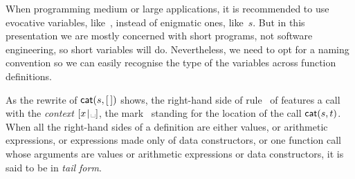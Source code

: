 When programming medium or large applications, it is recommended to
use evocative variables, like~, instead of
enigmatic ones, like~\(s\). But in this presentation we are mostly
concerned with short programs, not software engineering, so short
variables will do. Nevertheless, we need to opt for a naming
convention so we can easily recognise the type of the variables across
function definitions.


As the rewrite of \(\textsf{cat}(s,[\,])\) shows, the right\hyp{}hand side
of rule~\clause{\beta} of  features a call with the
\emph{context} \(\cons{x}{\text{\textvisiblespace}}\), the
mark~\textvisiblespace{} standing for the location of the call
\(\textsf{cat}(s,t)\). When all the right\hyp{}hand sides of a definition
are either values, or arithmetic expressions, or expressions made only
of data constructors, or one function call whose arguments are values
or arithmetic expressions or data constructors, it is said to be in
\emph{tail form}.

